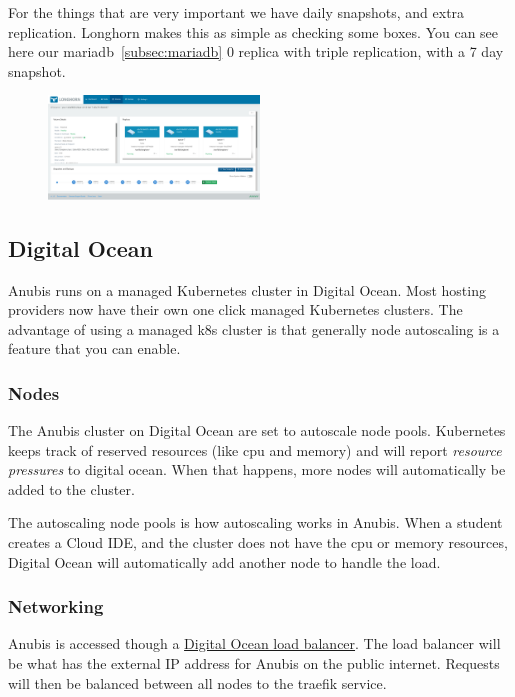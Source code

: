 For the things that are very important we have daily snapshots, and extra replication.
Longhorn makes this as simple as checking some boxes.
You can see here our mariadb~\ref{subsec:mariadb} 0 replica with triple replication, 
with a 7 day snapshot.

\begin{figure}
    \centering
    \includegraphics[width=0.5\textwidth]{figures/longhorn-mariadb.png}
\end{figure}

\subsection{Digital Ocean}\label{subsec:digital-ocean}

Anubis runs on a managed Kubernetes cluster in Digital Ocean.
Most hosting providers now have their own one click managed Kubernetes clusters.
The advantage of using a managed k8s cluster is that generally node autoscaling is
a feature that you can enable.

\subsubsection{Nodes}\label{subsubsec:digital-ocean-nodes}

The Anubis cluster on Digital Ocean are set to autoscale node pools.
Kubernetes keeps track of reserved resources (like cpu and memory) and will
report \textit{resource pressures} to digital ocean.
When that happens, more nodes will automatically be added to the cluster.

The autoscaling node pools is how autoscaling works in Anubis.
When a student creates a Cloud IDE, and the cluster does not have the cpu or 
memory resources, Digital Ocean will automatically add another node to handle the load.

\subsubsection{Networking}\label{subsubsec:digital-ocean-networking}

Anubis is accessed though a \href{https://docs.digitalocean.com/products/networking/load-balancers/}{Digital Ocean load balancer}.
The load balancer will be what has the external IP address for Anubis on the public internet.
Requests will then be balanced between all nodes to the traefik service.

